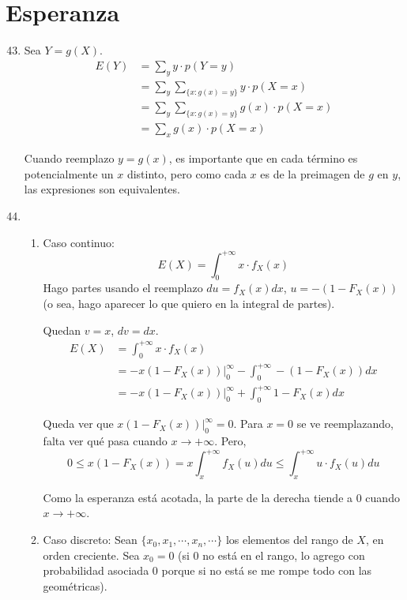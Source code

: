 \section{Esperanza}
\begin{enumerate}
	\setcounter{enumi}{42}
	\item
		Sea $Y = g(X)$.
		\begin{align*}
			E(Y)	& = \sum_{y} y\cdot p(Y=y)								\\
					& = \sum_{y} \sum_{\{x : g(x) = y\}} y\cdot p(X=x)		\\
					& = \sum_{y} \sum_{\{x : g(x) = y\}} g(x)\cdot p(X=x)	\\
					& = \sum_{x} g(x)\cdot p(X=x)
		\end{align*}
		
		Cuando reemplazo $y=g(x)$, es importante que en cada término es potencialmente un $x$ distinto,
		pero como cada $x$ es de la preimagen de $g$ en $y$, las expresiones son equivalentes.
		
	\item
		\begin{enumerate}
			\item Caso continuo:
				$$E(X) = \int_0^{+\infty} x\cdot f_X(x)$$
				Hago partes usando el reemplazo $du = f_X(x)dx$, $u = -(1 - F_X(x))$ (o sea, hago aparecer lo que quiero en la integral de partes).
				
				Quedan $v = x$, $dv = dx$.
				\begin{align*}
					E(X)	& = \int_0^{+\infty} x\cdot f_X(x)	\\
							& = -x(1-F_X(x))\Big|_0^\infty - \int_0^{+\infty} -(1 - F_X(x))dx	\\
							& = -x(1-F_X(x))\Big|_0^\infty + \int_0^{+\infty} 1 - F_X(x)dx
				\end{align*}
				
				Queda ver que $x(1-F_X(x))\big|_0^\infty = 0$. Para $x=0$ se ve reemplazando, falta ver qué pasa cuando $x\rightarrow +\infty$.
				Pero,
				$$0 \leq x(1-F_X(x)) = x\int_x^{+\infty}f_X(u)du \leq \int_x^{+\infty}u\cdot f_X(u)du$$
				
				Como la esperanza está acotada, la parte de la derecha tiende a $0$ cuando $x\rightarrow +\infty$.
			\item Caso discreto:
				Sean $\{x_0, x_1, \cdots, x_n, \cdots\}$ los elementos del rango de $X$, en orden creciente. Sea $x_0=0$
				(si $0$ no está en el rango, lo agrego con probabilidad asociada $0$ porque si no está se me rompe todo con las geométricas).
				

\end{enumerate}
\end{enumerate}
